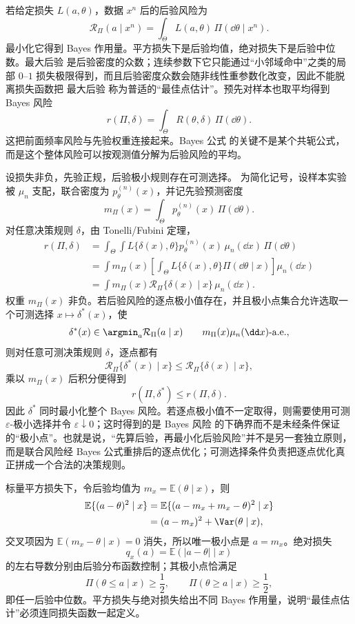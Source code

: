 \begin{definition}
若给定损失 $L(a,\theta)$，数据 $x^n$ 后的后验风险为
\[
 \mathcal R_\Pi(a\mid x^n)
 =\int_\Theta L(a,\theta)\,\Pi(\dd\theta\mid x^n).
\]
最小化它得到 Bayes 作用量。平方损失下是后验均值，绝对损失下是后验中位数。最大后验 是后验密度的众数；连续参数下它只能通过“小邻域命中”之类的局部 $0$--$1$ 损失极限得到，而且后验密度众数会随非线性重参数化改变，因此不能脱离损失函数把 最大后验 称为普适的“最佳点估计”。预先对样本也取平均得到 Bayes 风险
\[
 r(\Pi,\delta)
 =\int_\Theta R(\theta,\delta)\,\Pi(\dd\theta).
\]
这把前面频率风险与先验权重连接起来。Bayes 公式 的关键不是某个共轭公式，而是这个整体风险可以按观测值分解为后验风险的平均。
\end{definition}

\begin{proposition}[逐点后验最优化最小化整体风险]
设损失非负，先验正规，后验极小规则存在可测选择。
为简化记号，设样本实验被 $\mu_n$ 支配，联合密度为 $p_\theta^{(n)}(x)$，并记先验预测密度
\[
 m_\Pi(x)
 =\int_\Theta p_\theta^{(n)}(x)\,\Pi(\dd\theta).
\]
对任意决策规则 $\delta$，由 Tonelli/Fubini 定理，
\begin{align*}
 r(\Pi,\delta)
 &=\int_\Theta\int
 L\{\delta(x),\theta\}
 p_\theta^{(n)}(x)\,\mu_n(\dd x)\,\Pi(\dd\theta)\\
 &=\int m_\Pi(x)
 \left[
 \int_\Theta L\{\delta(x),\theta\}
 \Pi(\dd\theta\mid x)
 \right]\mu_n(\dd x)\\
 &=\int m_\Pi(x)
 \mathcal R_\Pi\{\delta(x)\mid x\}
 \,\mu_n(\dd x).
\end{align*}
权重 $m_\Pi(x)$ 非负。若后验风险的逐点极小值存在，并且极小点集合允许选取一个可测选择 $x\mapsto\delta^*(x)$，使
\[
 \delta^*(x)
 \in\argmin_a\mathcal R_\Pi(a\mid x)
 \qquad m_\Pi(x)\mu_n(\dd x)\text{-a.e.},
\]
则对任意可测决策规则 $\delta$，逐点都有
\[
 \mathcal R_\Pi\{\delta^*(x)\mid x\}
 \le
 \mathcal R_\Pi\{\delta(x)\mid x\},
\]
乘以 $m_\Pi(x)$ 后积分便得到
\[
 r(\Pi,\delta^*)\le r(\Pi,\delta).
\]
因此 $\delta^*$ 同时最小化整个 Bayes 风险。若逐点极小值不一定取得，则需要使用可测 $\varepsilon$-极小选择并令 $\varepsilon\downarrow0$；这时得到的是 Bayes 风险 的下确界而不是未经条件保证的“极小点”。也就是说，“先算后验，再最小化后验风险”并不是另一套独立原则，而是联合风险经 Bayes 公式重排后的逐点优化；可测选择条件负责把逐点优化真正拼成一个合法的决策规则。
\end{proposition}

\begin{workedexample}
标量平方损失下，令后验均值为 $m_x=\mathbb E(\theta\mid x)$，则
\begin{align*}
 \mathbb E\{(a-\theta)^2\mid x\}
 &=\mathbb E\{(a-m_x+m_x-\theta)^2\mid x\}\\
 &=(a-m_x)^2+\Var(\theta\mid x),
\end{align*}
交叉项因为 $\mathbb E(m_x-\theta\mid x)=0$ 消失，所以唯一极小点是 $a=m_x$。绝对损失
\[
 q_x(a)=\mathbb E(|a-\theta|\mid x)
\]
的左右导数分别由后验分布函数控制；其极小点恰满足
\[
 \Pi(\theta\le a\mid x)\ge\frac12,
 \qquad
 \Pi(\theta\ge a\mid x)\ge\frac12,
\]
即任一后验中位数。平方损失与绝对损失给出不同 Bayes 作用量，说明“最佳点估计”必须连同损失函数一起定义。
\end{workedexample}

